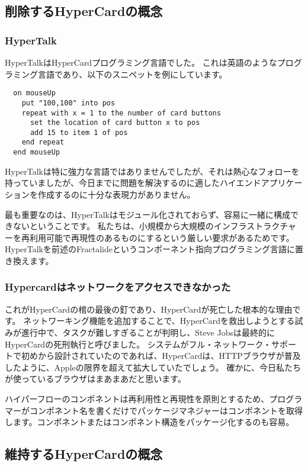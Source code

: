\documentclass[%
 aip,
 jmp,
 amsmath,amssymb,
 preprint,
 reprint,
 author-year,
 author-numerical,
]{revtex4-1}
\begin{document}
\begin{CJK}{UTF8}{ipxm}
\subsection{\label{sec:concepts to remove from HyperCard}削除するHyperCardの概念}
\subsubsection{\label{sec:HyperTalk}HyperTalk}
HyperTalkはHyperCardプログラミング言語でした。 これは英語のようなプログラミング言語であり、以下のスニペットを例にしています。
\begin{lstlisting}
  on mouseUp
    put "100,100" into pos
    repeat with x = 1 to the number of card buttons
      set the location of card button x to pos
      add 15 to item 1 of pos
    end repeat
  end mouseUp
\end{lstlisting}

HyperTalkは特に強力な言語ではありませんでしたが、それは熱心なフォローを持っていましたが、今日までに問題を解決するのに適したハイエンドアプリケーションを作成するのに十分な表現力がありません。

最も重要なのは、HyperTalkはモジュール化されておらず、容易に一緒に構成できないということです。
私たちは、小規模から大規模のインフラストラクチャーを再利用可能で再現性のあるものにするという厳しい要求があるためです。 HyperTalkを前述のFractalideというコンポーネント指向プログラミング言語に置き換えます。

\subsubsection{\label{sec:HyperCard lacked network access}Hypercardはネットワークをアクセスできなかった}

これがHyperCardの棺の最後の釘であり、HyperCardが死亡した根本的な理由です。 ネットワーキング機能を追加することで、HyperCardを救出しようとする試みが進行中で、タスクが難しすぎることが判明し、Steve Jobsは最終的にHyperCardの死刑執行と呼びました。
システムがフル・ネットワーク・サポートで初めから設計されていたのであれば、HyperCardは、HTTPブラウザが普及したように、Appleの限界を超えて拡大していたでしょう。 確かに、今日私たちが使っているブラウザはまあまあだと思います。

ハイパーフローのコンポネントは再利用性と再現性を原則とするため、プログラマーがコンポネント名を書くだけでパッケージマネジャーはコンポネントを取得します。コンポネントまたはコンポネント構造をパッケージ化するのも容易。

\subsection{\label{sec:Concepts from HyperCard to keep}維持するHyperCardの概念}

\end{CJK}
\end{document}
